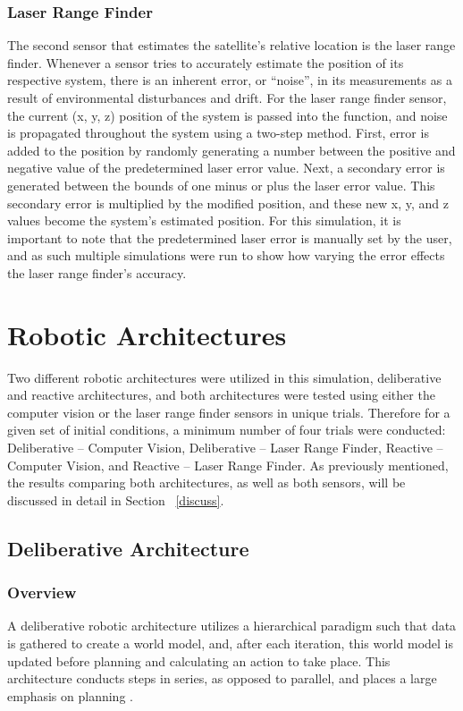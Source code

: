 \documentclass[journal, 10pt]{IEEEtran}
\begin{document}
\subsubsection{Laser Range Finder} \label{laser}
The second sensor that estimates the satellite's relative location is the laser range finder. Whenever a sensor tries to accurately estimate the position of its respective system, there is an inherent error, or ``noise'', in its measurements as a result of environmental disturbances and drift. 
For the laser range finder sensor, the current (x, y, z) position of the system is passed into the function, and noise is propagated throughout the system using a two-step method. First, error is added to the position by randomly generating a number between the positive and negative value of the predetermined laser error value. Next, a secondary error is generated between the bounds of one minus or plus the laser error value. This secondary error is multiplied by the modified position, and these new x, y, and z values become the system's estimated position.  For this simulation, it is important to note that the predetermined laser error is manually set by the user, and as such multiple simulations were run to show how varying the error effects the laser range finder's accuracy.


\section{Robotic Architectures}
Two different robotic architectures were utilized in this simulation, deliberative and reactive architectures, and both architectures were tested using either the computer vision or the laser range finder sensors in unique trials. Therefore for a given set of initial conditions, a minimum number of four trials were conducted: Deliberative -- Computer Vision, Deliberative -- Laser Range Finder, Reactive -- Computer Vision, and Reactive -- Laser Range Finder. As previously mentioned, the results comparing both architectures, as well as both sensors, will be discussed in detail in Section ~\ref{discuss}.

\subsection{Deliberative Architecture}
\subsubsection{Overview}
A deliberative robotic architecture utilizes a hierarchical paradigm such that data is gathered to create a world model, and, after each iteration, this world model is updated before planning and calculating an action to take place. This architecture conducts steps in series, as opposed to parallel, and places a large emphasis on planning \cite{joshi}.
\end{document}
